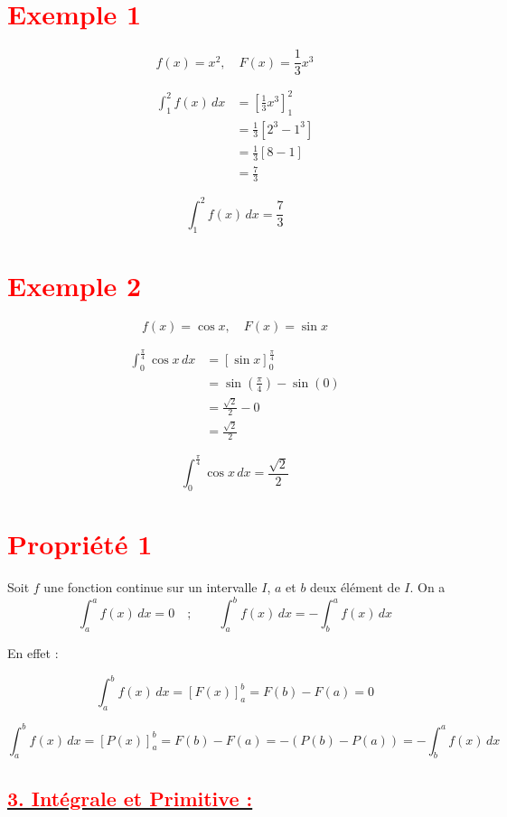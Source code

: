 \documentclass[12pt,a4paper]{article}
\begin{document}
\section*{\textbf{\textcolor{red}{Exemple 1}}}

\[
f(x) = x^2, \quad F(x) = \frac{1}{3} x^3
\]

\[
\begin{aligned}
\int_1^2 f(x) \, dx &= \left[ \frac{1}{3} x^3 \right]_1^2 \\
&= \frac{1}{3} \left[ 2^3 - 1^3 \right] \\
&= \frac{1}{3} \left[ 8 - 1 \right] \\
&= \frac{7}{3}
\end{aligned}
\]

\[\boxed{\int_1^2 f(x) \, dx=\frac{7}{3}} \]

\section*{\textbf{\textcolor{red}{Exemple 2}}}

\[
f(x) = \cos x, \quad F(x) = \sin x
\]

\[
\begin{aligned}
\int_0^{\frac{\pi}{4}} \cos x \, dx &= \left[ \sin x \right]_0^{\frac{\pi}{4}} \\
&= \sin \left( \frac{\pi}{4} \right) - \sin(0) \\
&= \frac{\sqrt{2}}{2} - 0 \\
&= \frac{\sqrt{2}}{2}
\end{aligned}
\]

\[\boxed{\int_0^{\frac{\pi}{4}} \cos x \, dx = \frac{\sqrt{2}}{2}} \]

\section*{\textbf{\textcolor{red}{Propriété 1 }}}
Soit \( f \) une fonction continue sur un intervalle \( I \), \( a \) et \( b \) deux élément de \( I \). On a
\[
\int_a^a f(x) \, dx = 0 \quad;\quad \quad \int_a^b f(x) \, dx = - \int_b^a f(x) \, dx
\]

En effet :

\[
\int_a^b f(x) \, dx = \left[ F(x) \right]_a^b = F(b) - F(a) = 0
\]

\[
\int_a^b f(x) \, dx = \left[ P(x) \right]_a^b = F(b) - F(a) = - \left( P(b) - P(a) \right)=-\int_b^a f(x) \, dx
\]

\subsection*{\underline{\textbf{\textcolor{red}{3. Intégrale et Primitive :}}}}
\end{document}
